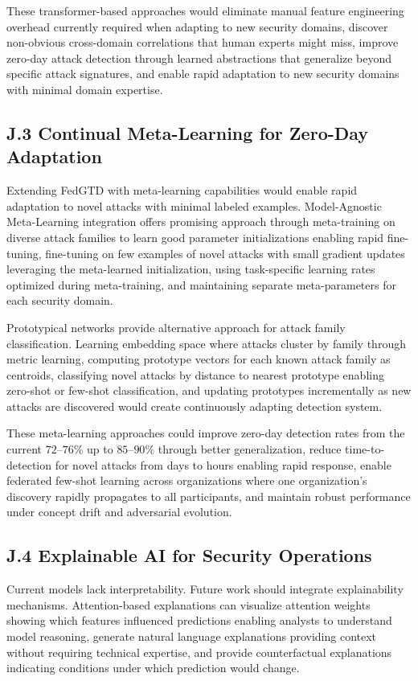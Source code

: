 \documentclass[12pt,a4paper]{article}
\theoremstyle{definition}
\begin{document}
These transformer-based approaches would eliminate manual feature engineering overhead currently required when adapting to new security domains, discover non-obvious cross-domain correlations that human experts might miss, improve zero-day attack detection through learned abstractions that generalize beyond specific attack signatures, and enable rapid adaptation to new security domains with minimal domain expertise.

\subsection{J.3 Continual Meta-Learning for Zero-Day Adaptation}

Extending FedGTD with meta-learning capabilities would enable rapid adaptation to novel attacks with minimal labeled examples. Model-Agnostic Meta-Learning integration offers promising approach through meta-training on diverse attack families to learn good parameter initializations enabling rapid fine-tuning, fine-tuning on few examples of novel attacks with small gradient updates leveraging the meta-learned initialization, using task-specific learning rates optimized during meta-training, and maintaining separate meta-parameters for each security domain.

Prototypical networks provide alternative approach for attack family classification. Learning embedding space where attacks cluster by family through metric learning, computing prototype vectors for each known attack family as centroids, classifying novel attacks by distance to nearest prototype enabling zero-shot or few-shot classification, and updating prototypes incrementally as new attacks are discovered would create continuously adapting detection system.

These meta-learning approaches could improve zero-day detection rates from the current $72$--$76\%$ up to $85$--$90\%$ through better generalization, reduce time-to-detection for novel attacks from days to hours enabling rapid response, enable federated few-shot learning across organizations where one organization's discovery rapidly propagates to all participants, and maintain robust performance under concept drift and adversarial evolution.

\subsection{J.4 Explainable AI for Security Operations}

Current models lack interpretability. Future work should integrate explainability mechanisms. Attention-based explanations can visualize attention weights showing which features influenced predictions enabling analysts to understand model reasoning, generate natural language explanations providing context without requiring technical expertise, and provide counterfactual explanations indicating conditions under which prediction would change.
\end{document}
